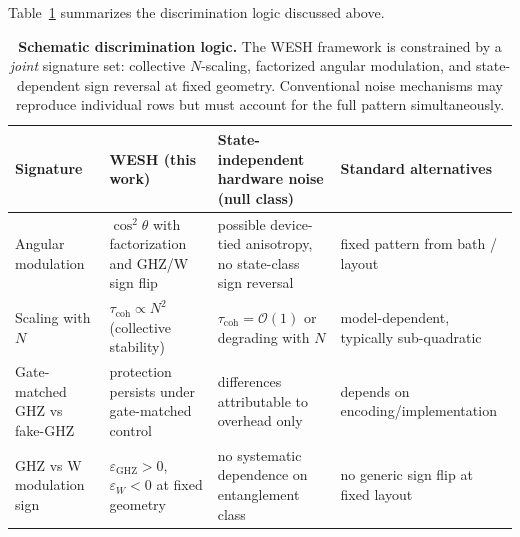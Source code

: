 \documentclass[12pt,a4paper]{article}
\numberwithin{equation}{section}
\begin{document}
\noindent Table~\ref{tab:discrimination} summarizes the discrimination logic discussed above.
\begin{table}[h]
\centering
\footnotesize
\setlength{\tabcolsep}{6pt}
\renewcommand{\arraystretch}{1.2}
\begin{tabularx}{\textwidth}{@{}l
  >{\raggedright\arraybackslash}X
  >{\raggedright\arraybackslash}X
  >{\raggedright\arraybackslash}X@{}}
\toprule
Signature &
WESH (this work) &
State-independent hardware noise (null class) &
Standard alternatives \\ \midrule
Angular modulation &
$\cos^2\theta$ with factorization
and GHZ/W sign flip &
possible device-tied anisotropy,
no state-class sign reversal &
fixed pattern from bath / layout \\[2pt]
Scaling with $N$ &
$\tau_{\mathrm{coh}}\propto N^2$ (collective stability) &
$\tau_{\mathrm{coh}}=\mathcal O(1)$ or degrading with $N$ &
model-dependent, typically sub-quadratic \\[2pt]
Gate-matched GHZ vs fake-GHZ &
protection persists under gate-matched control &
differences attributable to overhead only &
depends on encoding/implementation \\[2pt]
GHZ vs W modulation sign &
$\varepsilon_{\mathrm{GHZ}}>0$, $\varepsilon_{W}<0$ at fixed geometry &
no systematic dependence on entanglement class &
no generic sign flip at fixed layout \\ \bottomrule
\end{tabularx}
\caption{\textbf{Schematic discrimination logic.}  
The WESH framework is constrained by a \emph{joint} signature set:
collective $N$-scaling, factorized angular modulation, and
state-dependent sign reversal at fixed geometry.
Conventional noise mechanisms may reproduce individual rows but must account
for the full pattern simultaneously.}
\label{tab:discrimination}
\end{table}
\end{document}
